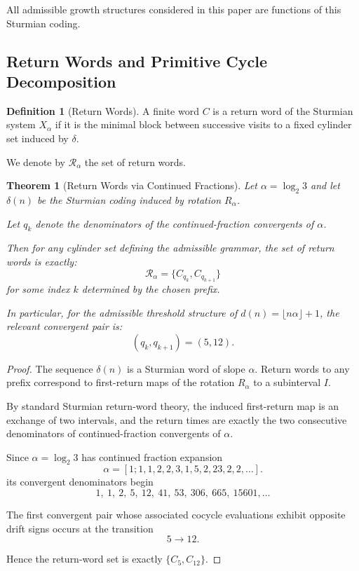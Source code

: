 \documentclass[12pt, oneside]{article}
\numberwithin{equation}{section}
\theoremstyle{definition}
\newtheorem{definition}{Definition}[section]
\theoremstyle{plain}
\newtheorem{theorem}{Theorem}[section]
\theoremstyle{remark}
\begin{document}
All admissible growth structures considered in this paper are functions
of this Sturmian coding.


\subsection{Return Words and Primitive Cycle Decomposition}

\begin{definition}[Return Words]
A finite word $C$ is a return word of the Sturmian system $X_\alpha$
if it is the minimal block between successive visits to a fixed cylinder
set induced by $\delta$.

We denote by $\mathcal{R}_\alpha$ the set of return words.
\end{definition}

\begin{theorem}[Return Words via Continued Fractions]
Let $\alpha = \log_2 3$ and let $\delta(n)$ be the Sturmian coding induced
by rotation $R_\alpha$.

Let $q_k$ denote the denominators of the continued-fraction convergents of $\alpha$.

Then for any cylinder set defining the admissible grammar, the set of return
words is exactly:
\[
\mathcal{R}_\alpha = \{C_{q_k}, C_{q_{k+1}}\}
\]
for some index $k$ determined by the chosen prefix.

In particular, for the admissible threshold structure of $d(n)=\lfloor n\alpha \rfloor +1$,
the relevant convergent pair is:
\[
(q_k, q_{k+1}) = (5,12).
\]
\end{theorem}

\begin{proof}
The sequence $\delta(n)$ is a Sturmian word of slope $\alpha$.
Return words to any prefix correspond to first-return maps of the rotation
$R_\alpha$ to a subinterval $I$.

By standard Sturmian return-word theory, the induced first-return map is an
exchange of two intervals, and the return times are exactly the two consecutive
denominators of continued-fraction convergents of $\alpha$.

Since $\alpha = \log_2 3$ has continued fraction expansion
\[
\alpha=[1;1,1,2,2,3,1,5,2,23,2,2,\dots].
\]
its convergent denominators begin
\[
1,\ 1,\ 2,\ 5,\ 12,\ 41,\ 53,\ 306,\ 665,\ 15601,\ldots
\]

The first convergent pair whose associated cocycle evaluations
exhibit opposite drift signs occurs at the transition
\[
5 \to 12.
\]

Hence the return-word set is exactly $\{C_5, C_{12}\}$.
\end{proof}
\end{document}
